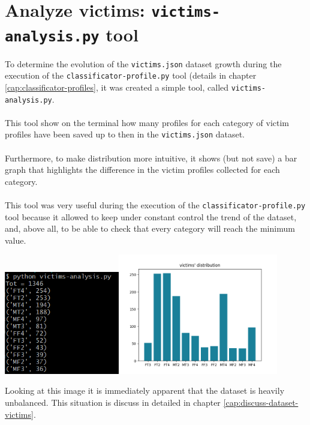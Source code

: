 \section{Analyze victims: \texttt{victims-analysis.py} tool}
\label{cap:victims-analysis}
To determine the evolution of the \texttt {victims.json} dataset growth during the execution of the \texttt {classificator-profile.py} tool (details in chapter \ref{cap:classificator-profiles}, it was created a simple tool, called \texttt{victims-analysis.py}.\\\\
This tool show on the terminal how many profiles for each category of victim profiles have been saved up to then in the \texttt{victims.json} dataset. \\\\
Furthermore, to make distribution more intuitive, it shows (but not save) a bar graph that highlights the difference in the victim profiles collected for each category. \\\\
This tool was very useful during the execution of the \texttt{classificator-profile.py} tool because it allowed to keep under constant control the trend of the dataset, and, above all, to be able to check that every category will reach the minimum value. 
\begin{center}
\includegraphics[height=4.5cm]{immagini/cmd-victims-analysis.png}\quad	\includegraphics[height=5.25cm]{immagini/victims-analysis-distributiom.png}
\end{center}
Looking at this image it is immediately apparent that the dataset is heavily unbalanced. This situation is discuss in detailed in chapter \ref{cap:discuss-dataset-victims}.

